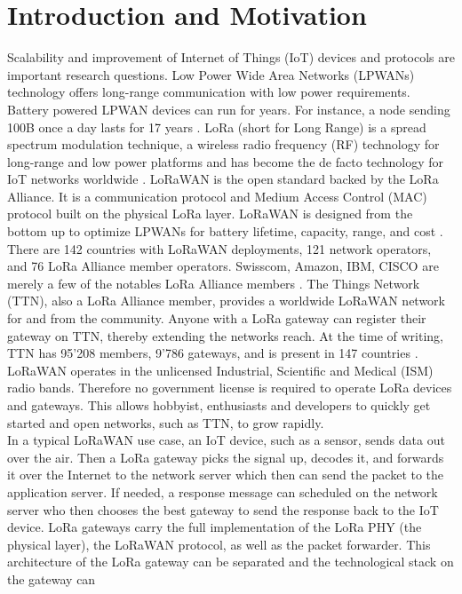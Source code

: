 \chapter{Introduction and Motivation}
\label{thesis:introduction}
Scalability and improvement of Internet of Things (IoT) devices and protocols
are important research questions.
Low Power Wide Area Networks (LPWANs) technology offers long-range communication
with low power requirements. Battery powered LPWAN devices can run for years.
For instance, a node sending 100B once a day lasts for 17 years \cite{morin}.
LoRa (short for Long Range) is a spread spectrum modulation
technique, a wireless radio frequency (RF) technology for long-range and low power platforms
and has become the de facto technology for IoT networks worldwide \cite{what_is_lora}.
LoRaWAN is the open standard backed by the LoRa Alliance. It is a communication protocol and
Medium Access Control (MAC) protocol built on the physical LoRa layer.
LoRaWAN is designed from the bottom up to optimize LPWANs
for battery lifetime, capacity, range, and cost \cite{what_is_lora_wan}.
There are 142 countries with LoRaWAN deployments, 121 network operators,
and 76 LoRa Alliance member operators. Swisscom, Amazon, IBM, CISCO are merely a few of the 
notables LoRa Alliance members \cite{lora_alliance}.
The Things Network (TTN), also a LoRa Alliance member, provides a worldwide LoRaWAN network 
for and from the community. Anyone with a LoRa gateway can register their gateway on TTN, thereby
extending the networks reach. At the time of writing, TTN has 95'208 members, 9'786 gateways, and is
present in 147 countries \cite{ttn}. LoRaWAN operates in the unlicensed Industrial, Scientific and Medical (ISM)
radio bands. Therefore no government license is required to operate LoRa devices and gateways. 
This allows hobbyist, enthusiasts and developers to quickly get started and open networks, such as TTN,
to grow rapidly.
\\
In a typical LoRaWAN use case, an IoT device, such as a sensor, sends data out over the air. Then a LoRa gateway picks
the signal up, decodes it, and forwards it over the Internet to the network server which then can send the packet to 
the application server. If needed, a response message can scheduled on the network server who then chooses the best gateway
to send the response back to the IoT device.
LoRa gateways carry the full implementation of the LoRa PHY (the physical layer), the LoRaWAN protocol, as well as 
the packet forwarder. This architecture of the LoRa gateway can be separated and the technological stack on the gateway can 
